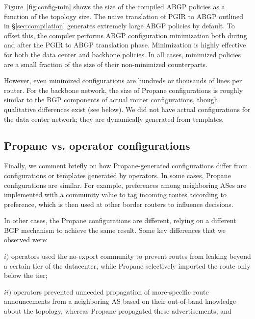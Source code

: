 \documentclass{sig-alternate-10pt}
\newcommand{\sysname}{{\small \sf Propane}\xspace}
\begin{document}
Figure~\ref{fig:config-min} shows the size of the compiled ABGP policies as a function of the topology size. The naive translation of PGIR to ABGP outlined in \S\ref{sec:compilation} generates extremely large ABGP policies by default. To offset this, the compiler performs ABGP configuration minimization both during and after the PGIR to ABGP translation phase.
Minimization is highly effective for both the data center and backbone policies. In all cases, minimized policies are a small fraction of the size of their non-minimized counterparts. 

However, even minimized configurations are hundreds or thousands of lines per router. For the backbone network, the size of \sysname configurations is roughly similar to the BGP components of actual router configurations, though qualitative differences exist (see below). We did not have actual configurations for the data center network; they are dynamically generated from templates. 


\subsection{Propane vs. operator configurations}

Finally, we comment briefly on how \sysname-generated configurations differ from configurations or templates generated by operators.
%
In some cases, \sysname configurations are similar. For example, preferences among neighboring ASes are implemented with a community value to tag incoming routes according to preference, which is then used at other border routers to influence decisions.

In other cases, the \sysname configurations are different, relying on a different BGP mechanism to achieve the same result. Some key differences that we observed were:

$i)$ operators used the no-export community to prevent routes from leaking beyond a certain tier of the datacenter, while \sysname selectively imported the route only below the tier;

$ii)$ operators prevented unneeded propagation of more-specific route announcements from a neighboring AS based on their out-of-band knowledge about the topology, whereas \sysname propagated these advertisements; and
\end{document}
